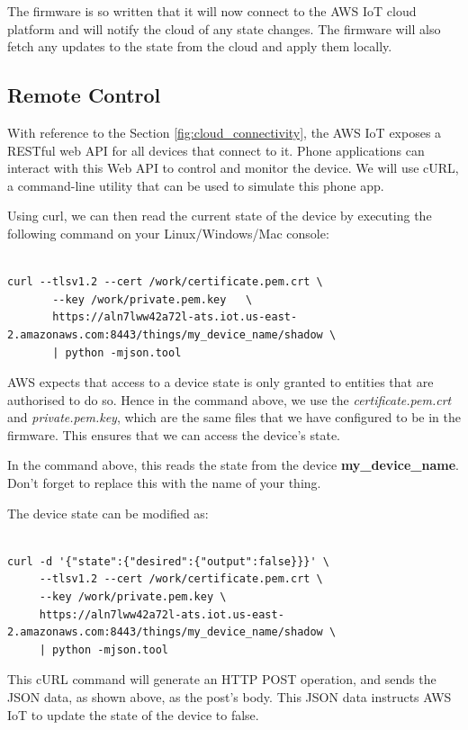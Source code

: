 \documentclass[11pt,fleqn]{book} %
\begin{document}
The firmware is so written that it will now connect to the AWS IoT cloud platform and will notify the cloud of any state changes. The firmware will also fetch any updates to the state from the cloud and apply them locally. 

\subsection{Remote Control}
With reference to the Section \ref{fig:cloud_connectivity}, the AWS IoT exposes a RESTful web API for all devices that connect to it. Phone applications can interact with this Web API to control and monitor the device. We will use cURL, a command-line utility that can be used to simulate this phone app. 

Using curl, we can then read the current state of the device by executing the following command on your Linux/Windows/Mac console:
\begin{verbatim}

curl --tlsv1.2 --cert /work/certificate.pem.crt \
       --key /work/private.pem.key   \
       https://aln7lww42a72l-ats.iot.us-east-2.amazonaws.com:8443/things/my_device_name/shadow \ 
       | python -mjson.tool

\end{verbatim}

AWS expects that access to a device state is only granted to entities that are authorised to do so. Hence in the command above, we use the \textit{certificate.pem.crt} and \textit{private.pem.key}, which are the same files that we have configured to be in the firmware. This ensures that we can access the device's state.

In the command above, this reads the state from the device \textbf{my\_device\_name}. Don't forget to replace this with the name of your thing.

The device state can be modified as:
\begin{verbatim}

curl -d '{"state":{"desired":{"output":false}}}' \ 
     --tlsv1.2 --cert /work/certificate.pem.crt \ 
     --key /work/private.pem.key \ 
     https://aln7lww42a72l-ats.iot.us-east-2.amazonaws.com:8443/things/my_device_name/shadow \ 
     | python -mjson.tool
\end{verbatim}

This cURL command will generate an HTTP POST operation, and sends the JSON data, as shown above, as the post's body. This JSON data instructs AWS IoT to update the state of the device to false.
\end{document}

